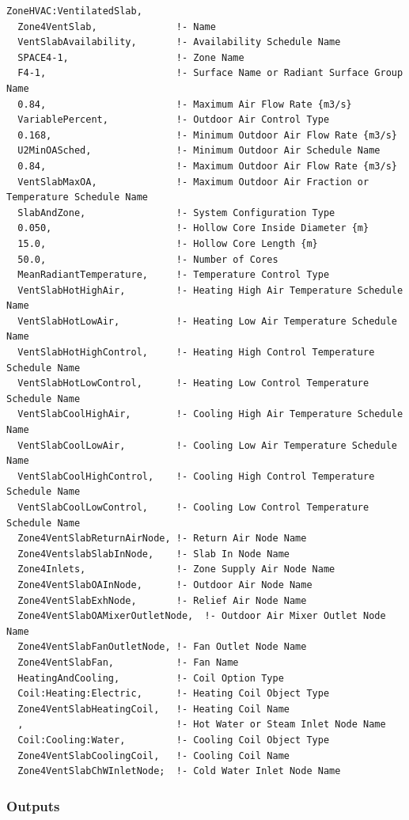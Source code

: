 \begin{lstlisting}
ZoneHVAC:VentilatedSlab,
  Zone4VentSlab,              !- Name
  VentSlabAvailability,       !- Availability Schedule Name
  SPACE4-1,                   !- Zone Name
  F4-1,                       !- Surface Name or Radiant Surface Group Name
  0.84,                       !- Maximum Air Flow Rate {m3/s}
  VariablePercent,            !- Outdoor Air Control Type
  0.168,                      !- Minimum Outdoor Air Flow Rate {m3/s}
  U2MinOASched,               !- Minimum Outdoor Air Schedule Name
  0.84,                       !- Maximum Outdoor Air Flow Rate {m3/s}
  VentSlabMaxOA,              !- Maximum Outdoor Air Fraction or Temperature Schedule Name
  SlabAndZone,                !- System Configuration Type
  0.050,                      !- Hollow Core Inside Diameter {m}
  15.0,                       !- Hollow Core Length {m}
  50.0,                       !- Number of Cores
  MeanRadiantTemperature,     !- Temperature Control Type
  VentSlabHotHighAir,         !- Heating High Air Temperature Schedule Name
  VentSlabHotLowAir,          !- Heating Low Air Temperature Schedule Name
  VentSlabHotHighControl,     !- Heating High Control Temperature Schedule Name
  VentSlabHotLowControl,      !- Heating Low Control Temperature Schedule Name
  VentSlabCoolHighAir,        !- Cooling High Air Temperature Schedule Name
  VentSlabCoolLowAir,         !- Cooling Low Air Temperature Schedule Name
  VentSlabCoolHighControl,    !- Cooling High Control Temperature Schedule Name
  VentSlabCoolLowControl,     !- Cooling Low Control Temperature Schedule Name
  Zone4VentSlabReturnAirNode, !- Return Air Node Name
  Zone4VentslabSlabInNode,    !- Slab In Node Name
  Zone4Inlets,                !- Zone Supply Air Node Name
  Zone4VentSlabOAInNode,      !- Outdoor Air Node Name
  Zone4VentSlabExhNode,       !- Relief Air Node Name
  Zone4VentSlabOAMixerOutletNode,  !- Outdoor Air Mixer Outlet Node Name
  Zone4VentSlabFanOutletNode, !- Fan Outlet Node Name
  Zone4VentSlabFan,           !- Fan Name
  HeatingAndCooling,          !- Coil Option Type
  Coil:Heating:Electric,      !- Heating Coil Object Type
  Zone4VentSlabHeatingCoil,   !- Heating Coil Name
  ,                           !- Hot Water or Steam Inlet Node Name
  Coil:Cooling:Water,         !- Cooling Coil Object Type
  Zone4VentSlabCoolingCoil,   !- Cooling Coil Name
  Zone4VentSlabChWInletNode;  !- Cold Water Inlet Node Name
\end{lstlisting}

\subsubsection{Outputs}\label{outputs-9-006}

